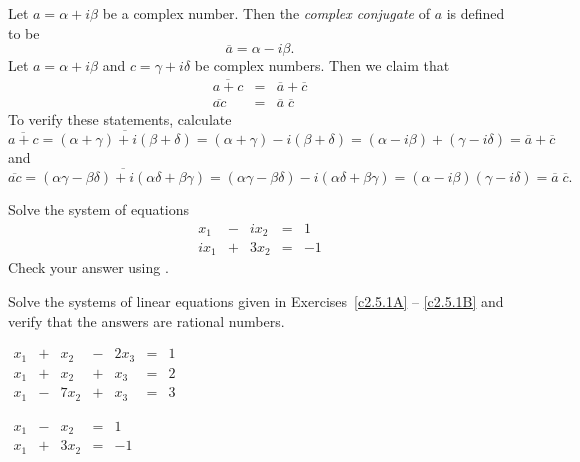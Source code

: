 \documentclass{ximera}
\begin{document}
Let $a=\alpha+i\beta$ be a complex number.  Then the {\em complex
conjugate\/}  of $a$ is defined to be
\[
\overline{a} = \alpha - i\beta.
\]
Let $a=\alpha+i\beta$ and $c=\gamma+i\delta$ be complex numbers.  Then we
claim that
\begin{equation}
\begin{array}{rcl}
\overline{a+c} & = & \overline{a} + \overline{c}\\
\overline{ac}  & = & \overline{a}\;\overline{c}
\end{array}
\end{equation}
To verify these statements, calculate
\[
\overline{a+c} = \overline{(\alpha+\gamma)+i(\beta+\delta)} =
(\alpha+\gamma)-i(\beta+\delta)= (\alpha-i\beta) + (\gamma-i\delta)
= \overline{a} + \overline{c}
\]
and
\[
\overline{ac} =
\overline{(\alpha\gamma-\beta\delta)+i(\alpha\delta+\beta\gamma)}
= (\alpha\gamma-\beta\delta)-i(\alpha\delta+\beta\gamma)
= (\alpha-i\beta)(\gamma-i\delta)=\overline{a}\;\overline{c}.
\]

\EXER

\TEXER

\begin{exercise} \label{c2.5.1}
Solve the system of equations
\[
\begin{array}{rcrcr}
 x_1 & - & ix_2 & = &  1\\
ix_1 & + & 3x_2 & = & -1
\end{array}
\]
Check your answer using \Matlabp.
\end{exercise}

\noindent Solve the systems of linear equations given in Exercises~\ref{c2.5.1A}
-- \ref{c2.5.1B} and verify that the answers are rational numbers. 
\begin{exercise} \label{c2.5.1A}
\qquad $\begin{array}{rcrcrcr}
         x_1 & + &   x_2 & - &   2x_3 & = & 1 \\
         x_1 & + &   x_2 & + &    x_3 & = & 2 \\
         x_1 & - &  7x_2 & + &    x_3 & = & 3
\end{array}$
\end{exercise}
\begin{exercise} \label{c2.5.1B}
\qquad $\begin{array}{rcrcr}
 x_1 & - &  x_2 & = &  1\\
 x_1 & + & 3x_2 & = & -1
\end{array}$
\end{exercise}
\end{document}

